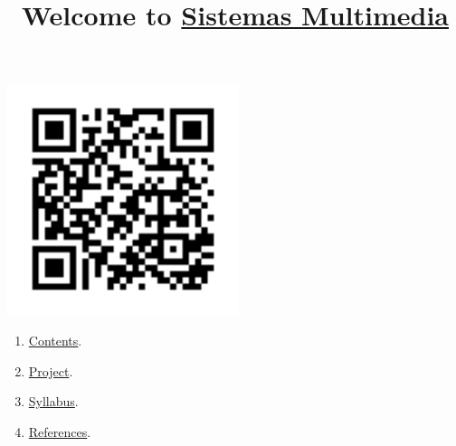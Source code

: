 
%
\title{Welcome to \href{https://www.ual.es/estudios/masteres/presentacion/plandeestudios/asignatura/7132/71321105}{Sistemas Multimedia}}

\maketitle

\begin{center}
  \includegraphics[width=256px]{SM_codigo_QR.png}
\end{center}

\begin{enumerate}
\item \href{https://sistemas-multimedia.github.io/contents}{Contents}.
\item \href{https://github.com/Sistemas-Multimedia/VCF}{Project}.
\item \href{https://sistemas-multimedia.github.io/syllabus}{Syllabus}.
\item \href{https://sistemas-multimedia.github.io/references}{References}.
\end{enumerate}
